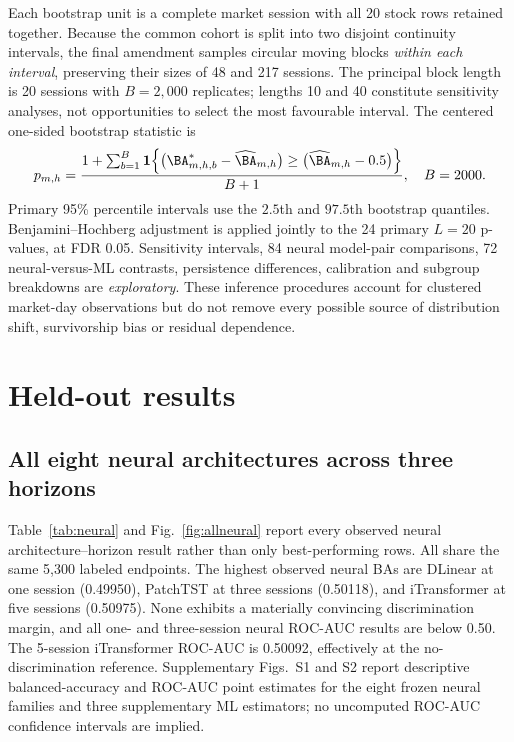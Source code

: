 \documentclass[fleqn,10pt]{wlscirep}
\begin{document}
Each bootstrap unit is a complete market session with all 20 stock rows retained together. Because the common cohort is split into two disjoint continuity intervals, the final amendment samples circular moving blocks \emph{within each interval}, preserving their sizes of 48 and 217 sessions. The principal block length is 20 sessions with $B=2,000$ replicates; lengths 10 and 40 constitute sensitivity analyses, not opportunities to select the most favourable interval. The centered one-sided bootstrap statistic is
\begin{equation}\label{eq:boot}
p_{m,h}=\frac{1+\sum_{b=1}^{B}\mathbf1\!\left\{\big(\BA_{m,h,b}^{*}-\widehat\BA_{m,h}\big)\ge \big(\widehat\BA_{m,h}-0.5\big)\right\}}{B+1},\quad B=2000.
\end{equation}
Primary 95\% percentile intervals use the $2.5$th and $97.5$th bootstrap quantiles. Benjamini--Hochberg adjustment is applied jointly to the 24 primary $L=20$ p-values, at FDR 0.05. Sensitivity intervals, 84 neural model-pair comparisons, 72 neural-versus-ML contrasts, persistence differences, calibration and subgroup breakdowns are \emph{exploratory}. These inference procedures account for clustered market-day observations but do not remove every possible source of distribution shift, survivorship bias or residual dependence.

\section{Held-out results}\label{sec:results}
\subsection{All eight neural architectures across three horizons}
Table~\ref{tab:neural} and Fig.~\ref{fig:allneural} report every observed neural architecture--horizon result rather than only best-performing rows. All share the same 5,300 labeled endpoints. The highest observed neural BAs are DLinear at one session (0.49950), PatchTST at three sessions (0.50118), and iTransformer at five sessions (0.50975). None exhibits a materially convincing discrimination margin, and all one- and three-session neural ROC-AUC results are below 0.50. The 5-session iTransformer ROC-AUC is 0.50092, effectively at the no-discrimination reference. Supplementary Figs.~S1 and S2 report descriptive balanced-accuracy and ROC-AUC point estimates for the eight frozen neural families and three supplementary ML estimators; no uncomputed ROC-AUC confidence intervals are implied.
\end{document}
